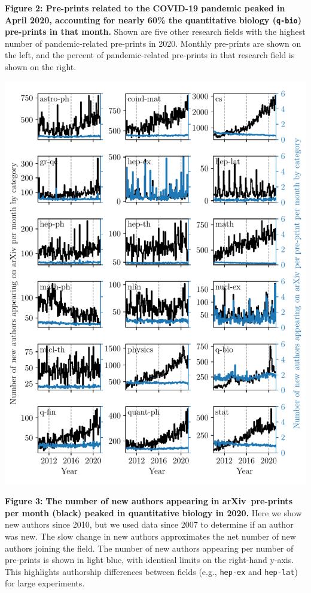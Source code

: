 \documentclass[a4paper,12pt]{article}
\newcommand{\arxiv}{arXiv}
\begin{document}
\noindent \textbf{Figure 2: Pre-prints related to the COVID-19 pandemic peaked in April 2020, accounting for nearly 60\% the quantitative biology (\texttt{q-bio}) pre-prints in that month.} Shown are five other research fields with the highest number of pandemic-related pre-prints in 2020. Monthly pre-prints are shown on the left, and the percent of pandemic-related pre-prints in that research field is shown on the right.

\newpage

\begin{center}
	\includegraphics[width=0.95\linewidth]{new-authors-segmented-by-field-combined}
\end{center}

\noindent \textbf{Figure 3:} \textbf{The number of new authors appearing in \arxiv\ pre-prints per month (black) peaked in quantitative biology in 2020.} Here we show new authors since 2010, but we used data since 2007 to determine if an author was new. The slow change in new authors  approximates the net number of new authors joining the field. The number of new authors appearing per number of pre-prints is shown in light blue, with identical limits on the right-hand y-axis. This highlights authorship differences between fields (e.g., \texttt{hep-ex} and \texttt{hep-lat}) for large experiments.
\end{document}

